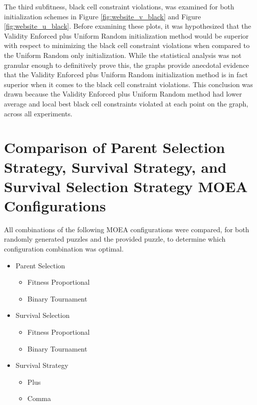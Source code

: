 \documentclass[11pt]{article}
\begin{document}
The third subfitness, black cell constraint violations, was examined for both initialization
schemes in Figure \ref{fig:website_v_black} and Figure \ref{fig:website_u_black}. Before examining
these plots, it was hypothesized that the Validity Enforced plus Uniform Random initialization 
method would be superior with respect to minimizing the black cell constraint violations when compared
to the Uniform Random only initialization. While the statistical analysis was not granular enough to
definitively prove this, the graphs provide anecdotal evidence that the Validity Enforced plus Uniform
Random initialization method is in fact superior when it comes to the black cell constraint violations.
This conclusion was drawn because the Validity Enforced plus Uniform Random method had lower average and
local best black cell constraints violated at each point on the graph, across all experiments.


\section{Comparison of Parent Selection Strategy, Survival Strategy, and Survival Selection Strategy
MOEA Configurations}

All combinations of the following MOEA configurations were compared, for both randomly generated 
puzzles and the provided puzzle, to determine which configuration combination was optimal.

\begin{itemize}
    \item Parent Selection
    \begin{itemize}
        \item Fitness Proportional
        \item Binary Tournament
    \end{itemize}

    \item Survival Selection
    \begin{itemize}
        \item Fitness Proportional
        \item Binary Tournament
    \end{itemize}

    \item Survival Strategy 
    \begin{itemize}
        \item Plus
        \item Comma
    \end{itemize}
\end{itemize}
\end{document}
